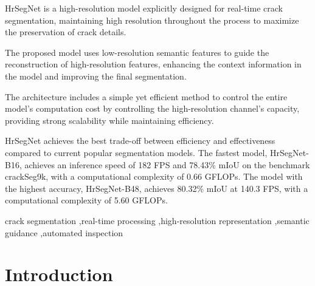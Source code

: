\documentclass[preprint,12pt,authoryear]{elsarticle}
\begin{document}
\begin{frontmatter}
\begin{highlights}
\item HrSegNet is a high-resolution model explicitly designed for real-time crack segmentation, maintaining high resolution throughout the process to maximize the preservation of crack details.
\item The proposed model uses low-resolution semantic features to guide the reconstruction of high-resolution features, enhancing the context information in the model and improving the final segmentation.
\item The architecture includes a simple yet efficient method to control the entire model's computation cost by controlling the high-resolution channel's capacity, providing strong scalability while maintaining efficiency.
\item HrSegNet achieves the best trade-off between efficiency and effectiveness compared to current popular segmentation models. The fastest model, HrSegNet-B16, achieves an inference speed of 182 FPS and 78.43\% mIoU on the benchmark crackSeg9k, with a computational complexity of 0.66 GFLOPs. The model with the highest accuracy, HrSegNet-B48, achieves 80.32\% mIoU at 140.3 FPS, with a computational complexity of 5.60 GFLOPs.
\end{highlights}



\begin{keyword}
crack segmentation \sep real-time processing \sep  high-resolution representation \sep  semantic guidance \sep automated inspection



\end{keyword}

\end{frontmatter}


\section{Introduction}
\label{sec:intro}

\end{document}

